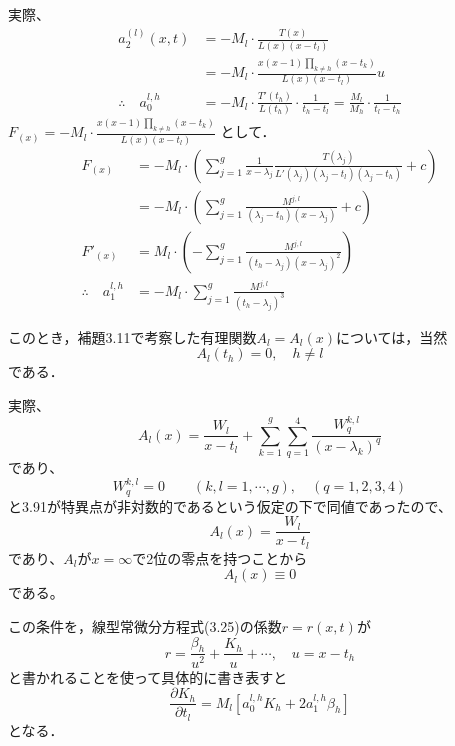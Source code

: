 実際、
\begin{align*}
    a_2^{(l)} (x,t) &= - M_l \cdot \frac{T(x)}{L(x)(x-t_l)} \\
    &= - M_l \cdot \frac{x(x-1)\prod_{k \neq h}(x-t_k)}{L(x)(x-t_l)} u \\
    \therefore \quad a_0^{l,h} &= - M_l \cdot \frac{T'(t_h)}{L(t_h)} \cdot \frac{1}{t_h - t_l} = \frac{M_l}{M_h} \cdot \frac{1}{t_l - t_h}
\end{align*}
$F_{(x)} = \displaystyle - M_l \cdot \frac{x(x-1)\prod_{k \neq h}(x-t_k)}{L(x)(x-t_l)}$ として．
\begin{align*}
    F_{(x)} &= - M_l \cdot \left( \sum_{j=1}^g \frac{1}{x-\lambda_j} \frac{T(\lambda_j)}{L'(\lambda_j) (\lambda_j-t_l) (\lambda_j-t_h)} + c \right) \\
    &= - M_l \cdot \left( \sum_{j=1}^g \frac{M^{j,l}}{(\lambda_j-t_h)(x-\lambda_j)} + c \right) \\
    F'_{(x)} &= M_l \cdot \left( - \sum_{j=1}^g \frac{M^{j,l}}{(t_h-\lambda_j)(x-\lambda_j)^2} \right) \\
    \therefore \quad a_1^{l,h} &= - M_l \cdot \sum_{j=1}^g \frac{M^{j,l}}{(t_h-\lambda_j)^3}
\end{align*}
\begin{story}
このとき，補題3.11で考察した有理関数$A_l = A_l(x)$については，当然
\begin{equation*}
    A_l(t_h) = 0, \quad h \neq l
\end{equation*}
である．
\end{story}
実際、
\[
A_l(x) = \frac{W_l}{x-t_l} + \sum_{k=1}^g \sum_{q=1}^4 \frac{W_q^{k,l}}{(x-\lambda_k)^q}
\]
であり、
\begin{equation} \tag{3.93}
W_q^{k,l} = 0 \qquad (k, l = 1, \cdots, g), \quad (q = 1, 2, 3, 4)
\end{equation}
と3.91が特異点が非対数的であるという仮定の下で同値であったので、
\[
A_l(x) = \frac{W_l}{x-t_l}
\]
であり、$A_l$が$x=\infty$で2位の零点を持つことから
\[
A_{l}(x)\equiv 0
\]
である。
\begin{story}
この条件を，線型常微分方程式(3.25)の係数$r = r(x,t)$が
\begin{equation*}
    r = \frac{\beta_h}{u^2} + \frac{K_h}{u} + \cdots, \quad u = x - t_h
\end{equation*}
と書かれることを使って具体的に書き表すと
\begin{equation*}
    \frac{\partial K_h}{\partial t_l} = M_l \left[ a_0^{l,h} K_h + 2 a_1^{l,h} \beta_h \right]
\end{equation*}
となる．
\end{story}
